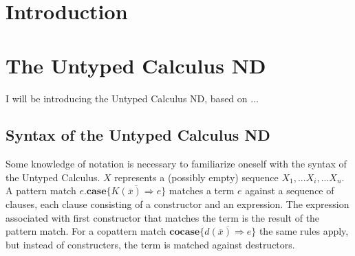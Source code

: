 \documentclass[twoside,12pt,a4paper]{article}
\begin{document}
\section{Introduction}


\section{The Untyped Calculus ND}

I will be introducing the Untyped Calculus ND, based on ... %

\subsection{Syntax of the Untyped Calculus ND}



Some knowledge of notation is necessary to familiarize oneself with the syntax of the Untyped Calculus.
$X$ represents a (possibly empty) sequence $X_1, ... X_i, ... X_n$.  
\\
A pattern match $e.\textbf{case}\{\overline{K(\overline{x})\Rightarrow e}\}$ 
matches a term $e$ against a sequence of clauses, each clause consisting of a constructor and an expression.
The expression associated with first constructor %
that matches the term is the result of the pattern match. %
For a copattern match $\textbf{cocase} \{\overline{d(\overline{x}) \Rightarrow e}\}$
the same rules apply, but instead of constructers, the term is matched against destructors.

\iffalse
\begin{equation}
    \begin{split}
        e ::&= x \quad \text{Variables} \\
        &| \; \constructor       \quad \text{Constructors} \\
        &| \; \destructor         \quad \text{Destructors} \\
        &| \; \patmatch       \quad \text{Pattern match}\\
        &| \; \copatmatch      \quad \text{Copattern match}
    \end{split}
\end{equation}
\fi
\end{document}
